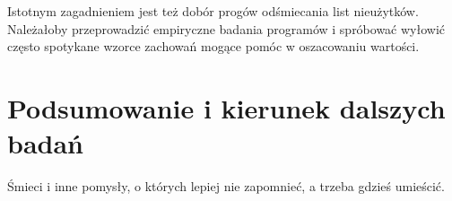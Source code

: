 \documentclass[12pt,a4paper,titlepage,twoside]{mwart}
\begin{document}
Istotnym zagadnieniem jest też dobór progów odśmiecania list nieużytków.
Należałoby przeprowadzić empiryczne badania programów i spróbować wyłowić
często spotykane wzorce zachowań mogące pomóc w oszacowaniu wartości.

\newpage


\section{Podsumowanie i kierunek dalszych badań}
\hypertarget{Podsumowanie}{}

Śmieci i inne pomysły, o których lepiej nie zapomnieć, a trzeba gdzieś umieścić.

\newpage


\nocite{berger00hoard}
\nocite{berger01composing}
\nocite{berger02reconsidering}
\nocite{bonwick94slab}
\nocite{chilimbi00designing}
\nocite{demaine99fast}
\nocite{douglea96malloc}
\nocite{evans06scalable}
\nocite{feng05localityimproving}
\nocite{fitzgibbons00linux}
\nocite{ghemawat07tcmalloc}
\nocite{gorman04linuxvm}
\nocite{iyengar96scalability}
\nocite{johnstone98memory}
\nocite{luby94tight}
\nocite{pas02memory}
\nocite{paul95dynamic}
\nocite{robson71estimate}
\nocite{robson74bounds}
\nocite{robson77worst}
\nocite{stephenson83fastfits}
\nocite{vuillemin80unifying}
\nocite{weinstock88quickfit}



\end{document}
